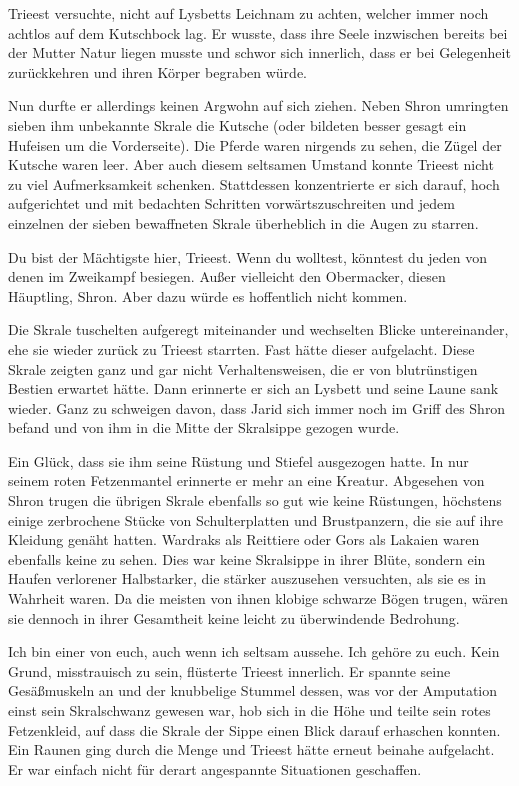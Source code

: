 Trieest versuchte, nicht auf Lysbetts Leichnam zu achten, welcher immer noch achtlos auf dem Kutschbock lag. Er wusste, dass ihre Seele inzwischen bereits bei der Mutter Natur liegen musste und schwor sich innerlich, dass er bei Gelegenheit zurückkehren und ihren Körper begraben würde.

Nun durfte er allerdings keinen Argwohn auf sich ziehen. Neben Shron umringten sieben ihm unbekannte Skrale die Kutsche (oder bildeten besser gesagt ein Hufeisen um die Vorderseite). Die Pferde waren nirgends zu sehen, die Zügel der Kutsche waren leer. Aber auch diesem seltsamen Umstand konnte Trieest nicht zu viel Aufmerksamkeit schenken. Stattdessen konzentrierte er sich darauf, hoch aufgerichtet und mit bedachten Schritten vorwärtszuschreiten und jedem einzelnen der sieben bewaffneten Skrale überheblich in die Augen zu starren.

Du bist der Mächtigste hier, Trieest. Wenn du wolltest, könntest du jeden von denen im Zweikampf besiegen. Außer vielleicht den Obermacker, diesen Häuptling, Shron. Aber dazu würde es hoffentlich nicht kommen.

Die Skrale tuschelten aufgeregt miteinander und wechselten Blicke untereinander, ehe sie wieder zurück zu Trieest starrten. Fast hätte dieser aufgelacht. Diese Skrale zeigten ganz und gar nicht Verhaltensweisen, die er von blutrünstigen Bestien erwartet hätte. Dann erinnerte er sich an Lysbett und seine Laune sank wieder. Ganz zu schweigen davon, dass Jarid sich immer noch im Griff des Shron befand und von ihm in die Mitte der Skralsippe gezogen wurde.

Ein Glück, dass sie ihm seine Rüstung und Stiefel ausgezogen hatte. In nur seinem roten Fetzenmantel erinnerte er mehr an eine Kreatur. Abgesehen von Shron trugen die übrigen Skrale ebenfalls so gut wie keine Rüstungen, höchstens einige zerbrochene Stücke von Schulterplatten und Brustpanzern, die sie auf ihre Kleidung genäht hatten. Wardraks als Reittiere oder Gors als Lakaien waren ebenfalls keine zu sehen. Dies war keine Skralsippe in ihrer Blüte, sondern ein Haufen verlorener Halbstarker, die stärker auszusehen versuchten, als sie es in Wahrheit waren. Da die meisten von ihnen klobige schwarze Bögen trugen, wären sie dennoch in ihrer Gesamtheit keine leicht zu überwindende Bedrohung.

Ich bin einer von euch, auch wenn ich seltsam aussehe. Ich gehöre zu euch. Kein Grund, misstrauisch zu sein, flüsterte Trieest innerlich. Er spannte seine Gesäßmuskeln an und der knubbelige Stummel dessen, was vor der Amputation einst sein Skralschwanz gewesen war, hob sich in die Höhe und teilte sein rotes Fetzenkleid, auf dass die Skrale der Sippe einen Blick darauf erhaschen konnten. Ein Raunen ging durch die Menge und Trieest hätte erneut beinahe aufgelacht. Er war einfach nicht für derart angespannte Situationen geschaffen.

